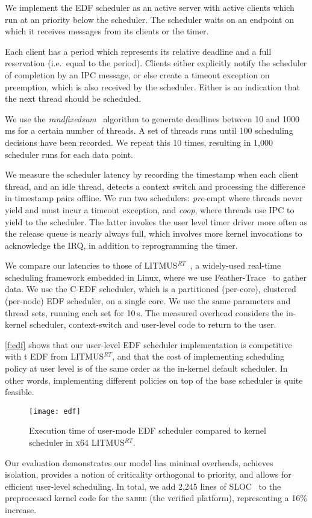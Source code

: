 We implement the EDF scheduler as an active server with active
clients which run at an \selfour priority below the scheduler.
The scheduler waits on an endpoint on which it receives messages from
its clients or the timer.

Each client has a period which represents its relative deadline and a full reservation (i.e.\ equal to the period). Clients
either explicitly notify the scheduler of completion by an IPC
message, or else create a timeout exception on preemption, which is also received by the
scheduler. Either is an indication that the next thread should be scheduled.

We use the \emph{randfixedsum}~\citep{Emberson_SD_10} algorithm to
generate deadlines between 10 and 1000\,ms for a certain number of threads.
A set of threads runs until 100
scheduling decisions have been recorded. We repeat this 10 times,
resulting in 1,000 scheduler runs for each data point.

We measure the scheduler latency by recording the timestamp when each client thread, and an idle
thread, detects a
context switch and processing the difference in timestamp pairs offline. We run two schedulers:
\emph{pre}-empt where threads never yield and must incur a timeout exception, and \emph{coop}, where
threads use IPC to yield to the scheduler. The latter invokes the user level timer
driver more often as the release queue is nearly always full, which involves more kernel invocations
to acknowledge the IRQ, in addition to reprogramming the timer.

We compare our latencies to those of
LITMUS$^{RT}$~\citep{Calandrino_LBDA_07}, a widely-used real-time scheduling
framework embedded in Linux, where we use Feather-Trace~\citep{Brandenburg_Anderson_07} to gather data.
We use the C-EDF scheduler, which is a partitioned (per-core), clustered (per-node) EDF scheduler, on a single
core. We use the same parameters and thread sets, running each set for 10\,s. 
The measured overhead considers the in-kernel scheduler, context-switch and user-level code to return to
the user.

\autoref{f:edf} shows that our user-level EDF scheduler implementation is
competitive with t EDF from LITMUS$^{RT}$, and
that the cost of implementing scheduling policy at user level is of
the same order as the in-kernel default scheduler. In other words,
implementing different policies on top of the base scheduler is quite feasible.

\begin{figure}[t]
    \centering
    \texttt{[image: edf]}
    \caption{Execution time of \selfour user-mode EDF scheduler compared to
             kernel scheduler in \textsc{x64} LITMUS$^{RT}$.}
    \label{f:edf}
\end{figure}


Our evaluation demonstrates our model has minimal overheads, achieves isolation,  provides a notion
of criticality orthogonal to priority, and allows for efficient user-level scheduling.
In total, we add 2,245 lines of SLOC~\citep{Wheeler_01} to the preprocessed kernel code for the \textsc{sabre}
(the verified platform), representing a 16\% increase.

